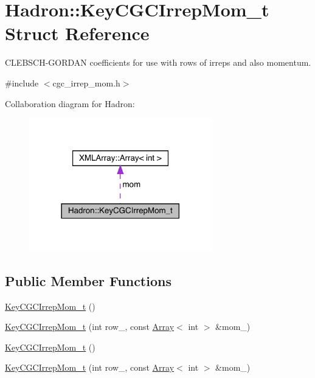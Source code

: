 \hypertarget{structHadron_1_1KeyCGCIrrepMom__t}{}\section{Hadron\+:\+:Key\+C\+G\+C\+Irrep\+Mom\+\_\+t Struct Reference}
\label{structHadron_1_1KeyCGCIrrepMom__t}


C\+L\+E\+B\+S\+C\+H-\/\+G\+O\+R\+D\+AN coefficients for use with rows of irreps and also momentum.  




{\ttfamily \#include $<$cgc\+\_\+irrep\+\_\+mom.\+h$>$}



Collaboration diagram for Hadron\+:\nopagebreak
\begin{figure}[H]
\begin{center}
\leavevmode
\includegraphics[width=225pt]{da/d01/structHadron_1_1KeyCGCIrrepMom__t__coll__graph}
\end{center}
\end{figure}
\subsection*{Public Member Functions}
\begin{DoxyCompactItemize}
\item 
\mbox{\hyperlink{structHadron_1_1KeyCGCIrrepMom__t_aa3965e02d80a6c483de3e253a4de7826}{Key\+C\+G\+C\+Irrep\+Mom\+\_\+t}} ()
\item 
\mbox{\hyperlink{structHadron_1_1KeyCGCIrrepMom__t_a467e3ce4ab08bc6438ac855240bead31}{Key\+C\+G\+C\+Irrep\+Mom\+\_\+t}} (int row\+\_\+, const \mbox{\hyperlink{classXMLArray_1_1Array}{Array}}$<$ int $>$ \&mom\+\_\+)
\item 
\mbox{\hyperlink{structHadron_1_1KeyCGCIrrepMom__t_aa3965e02d80a6c483de3e253a4de7826}{Key\+C\+G\+C\+Irrep\+Mom\+\_\+t}} ()
\item 
\mbox{\hyperlink{structHadron_1_1KeyCGCIrrepMom__t_a467e3ce4ab08bc6438ac855240bead31}{Key\+C\+G\+C\+Irrep\+Mom\+\_\+t}} (int row\+\_\+, const \mbox{\hyperlink{classXMLArray_1_1Array}{Array}}$<$ int $>$ \&mom\+\_\+)
\end{DoxyCompactItemize}
